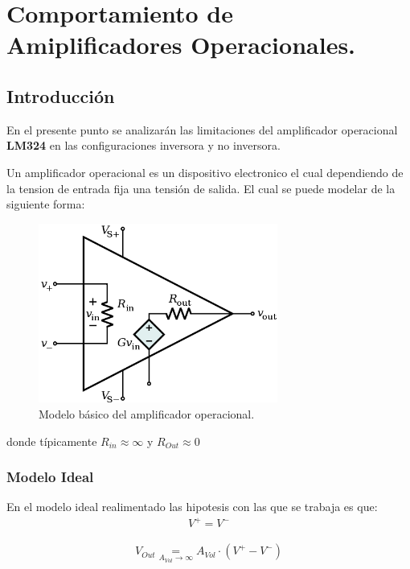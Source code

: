
\newcommand\underrel[2]{\mathrel{\mathop{#2}\limits_{#1}}}



\section{Comportamiento de Amiplificadores Operacionales.}

\subsection{Introducción}
En el presente punto se analizarán las limitaciones del amplificador operacional  \textbf{LM324} en las configuraciones inversora y no inversora.

Un amplificador operacional es un dispositivo electronico el cual dependiendo de la tension de entrada fija una tensión de salida.
El cual se puede modelar de la siguiente forma:
\begin{figure}[H]	
	\centering
	\includegraphics[width=0.7\textwidth]{Ejercicio1/Imagenes/Basicopamp.png}
	\caption{Modelo básico del amplificador operacional.}
	\label{fig:Basicopamp}
\end{figure}
donde típicamente $R_{in}\approx \infty$ y $R_{Out} \approx 0$
\subsubsection{Modelo Ideal}
En el modelo ideal realimentado las hipotesis con las que se trabaja es que:
\begin{align}
V^+ = V^-\end{align}

\begin{align}V_{Out} \underrel{A_{Vol}\to \infty}{=} A_{Vol} \cdot (V^+ - V^-)\end{align}

